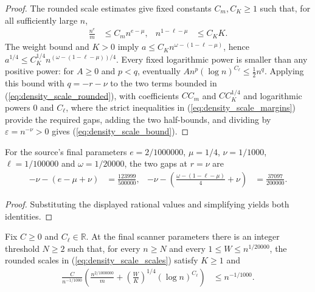 \begin{proof}
    \leanok
    The rounded scale estimates give fixed constants $C_m,C_K\geq1$
    such that, for all sufficiently large $n$,
    \begin{align}
        \frac{n^e}{m}  & \leq C_m n^{e-\mu}, &
        n^{1-\ell-\mu} & \leq C_KK.
        \label{eq:density_scale_rounded}
    \end{align}
    The weight bound and $K>0$ imply
    $a\leq C_Kn^{\omega-(1-\ell-\mu)}$, hence
    $a^{1/4}\leq C_K^{1/4}n^{(\omega-(1-\ell-\mu))/4}$.
    Every fixed logarithmic power is smaller than any positive power:
    for $A\geq0$ and $p<q$, eventually
    $A n^p(\log n)^{C_\ell}\leq\tfrac12 n^q$.
    Applying this bound with $q=-r-\nu$ to the two terms bounded in
    (\ref{eq:density_scale_rounded}), with coefficients
    $CC_m$ and $CC_K^{1/4}$ and logarithmic powers $0$ and $C_\ell$,
    where the strict inequalities in (\ref{eq:density_scale_margins}) provide
    the required gaps, adding the two half-bounds, and dividing by
    $\varepsilon=n^{-\nu}>0$ gives (\ref{eq:density_scale_bound}).
\end{proof}

\begin{lemma}
    \label{thm:arealaw-source-density-margins}
    \leanok
    For the source's final parameters
    $e=2/1000000$, $\mu=1/4$, $\nu=1/1000$,
    $\ell=1/100000$ and $\omega=1/20000$, the two gaps at $r=\nu$ are
    \begin{align}
        -\nu-(e-\mu+\nu) & =\frac{123999}{500000}, &
        -\nu-\left(\frac{\omega-(1-\ell-\mu)}4+\nu\right)
                         & =\frac{37097}{200000}.
        \label{eq:density_scale_final_gaps}
    \end{align}
\end{lemma}

\begin{proof}
    \leanok
    Substituting the displayed rational values and simplifying yields both identities.
\end{proof}

\begin{lemma}
    \label{thm:arealaw-source-density-final}
    \leanok
    Fix $C\geq0$ and $C_\ell\in\mathbb R$. At the final scanner
    parameters there is an integer threshold $N\geq2$ such that,
    for every $n\geq N$ and every $1\leq W\leq n^{1/20000}$,
    the rounded scales in (\ref{eq:density_scale_scales})
    satisfy $K\geq1$ and
    \begin{align}
        \frac{C}{n^{-1/1000}}
        \left(\frac{n^{2/1000000}}{m}
        +\left(\frac WK\right)^{1/4}(\log n)^{C_\ell}\right)
         & \leq n^{-1/1000}.
        \label{eq:density_scale_final_bound}
    \end{align}
\end{lemma}

